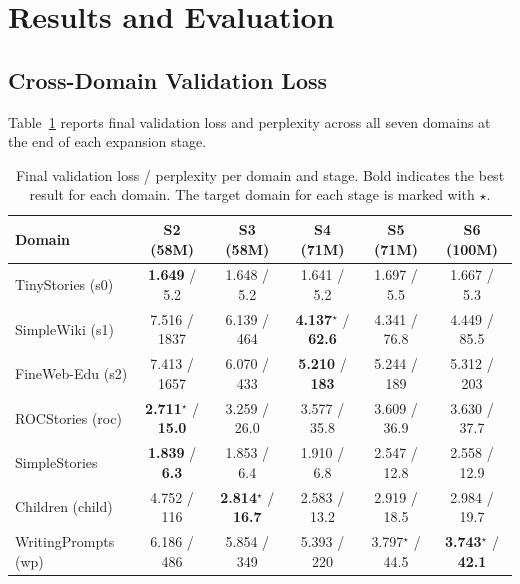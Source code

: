 \section{Results and Evaluation}

\subsection{Cross-Domain Validation Loss}

Table~\ref{tab:results} reports final validation loss and perplexity across
all seven domains at the end of each expansion stage.

\begin{table}[H]
\centering\small
\caption{Final validation loss / perplexity per domain and stage.  Bold
indicates the best result for each domain.  The target domain for each stage
is marked with $\star$.}
\label{tab:results}
\begin{tabular}{l|ccccc}
\toprule
\textbf{Domain} & \textbf{S2 (58M)} & \textbf{S3 (58M)} & \textbf{S4 (71M)}
& \textbf{S5 (71M)} & \textbf{S6 (100M)} \\
\midrule
TinyStories (s0)
  & \textbf{1.649} / 5.2  & 1.648 / 5.2  & 1.641 / 5.2
  & 1.697 / 5.5  & 1.667 / 5.3 \\
SimpleWiki (s1)
  & 7.516 / 1837 & 6.139 / 464  & \textbf{4.137}$^\star$ / \textbf{62.6}
  & 4.341 / 76.8 & 4.449 / 85.5 \\
FineWeb-Edu (s2)
  & 7.413 / 1657 & 6.070 / 433  & \textbf{5.210} / \textbf{183}
  & 5.244 / 189  & 5.312 / 203  \\
ROCStories (roc)
  & \textbf{2.711}$^\star$ / \textbf{15.0}
  & 3.259 / 26.0 & 3.577 / 35.8 & 3.609 / 36.9 & 3.630 / 37.7 \\
SimpleStories
  & \textbf{1.839} / \textbf{6.3}
  & 1.853 / 6.4  & 1.910 / 6.8  & 2.547 / 12.8 & 2.558 / 12.9 \\
Children (child)
  & 4.752 / 116  & \textbf{2.814}$^\star$ / \textbf{16.7}
  & 2.583 / 13.2 & 2.919 / 18.5 & 2.984 / 19.7 \\
WritingPrompts (wp)
  & 6.186 / 486  & 5.854 / 349  & 5.393 / 220
  & 3.797$^\star$ / 44.5
  & \textbf{3.743}$^\star$ / \textbf{42.1} \\
\bottomrule
\end{tabular}
\end{table}

